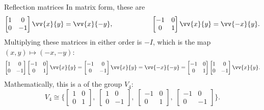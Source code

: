 \documentclass[8pt, handout]{beamer}
\newcommand{\Pause}{}
\begin{document}
\begin{frame}{Reflection matrices}
  In matrix form, these are
  \[
  \begin{bmatrix}1 & 0 \\ 0 & -1\end{bmatrix}\vv{x}{y}=\vv{x}{-y},\hspace{20mm}
  \begin{bmatrix}-1 & 0 \\ 0 & 1\end{bmatrix}\vv{x}{y}=\vv{-x}{y}.
  \]
  \pause Multiplying these matrices in either order is $-I$, which is the map
  $(x,y)\mapsto(-x,-y)$: \Pause
  \[
  \begin{bmatrix}1 & 0 \\ 0 & -1\end{bmatrix}
  \begin{bmatrix}-1 & 0 \\ 0 & 1\end{bmatrix}\vv{x}{y}\Pause=
  \begin{bmatrix}-1 & 0 \\ 0 & -1\end{bmatrix}\vv{x}{y}\Pause=\vv{-x}{-y}\Pause=
  \begin{bmatrix}-1 & 0 \\ 0 & 1\end{bmatrix}
  \begin{bmatrix}1 & 0 \\ 0 & -1\end{bmatrix}\vv{x}{y}.
  \]
  \Pause Mathematically, this is a  of the group $V_4$:
  \[
  V_4\cong\Bigg\{\begin{bmatrix}1 & 0 \\ 0 & 1\end{bmatrix},\;
  \begin{bmatrix}1 & 0 \\ 0 & -1\end{bmatrix},\;
  \begin{bmatrix}-1 & 0 \\ 0 & 1\end{bmatrix},\;
  \begin{bmatrix}-1 & 0 \\ 0 & -1\end{bmatrix}\Bigg\}.
  \]

\end{frame}

\end{document}
